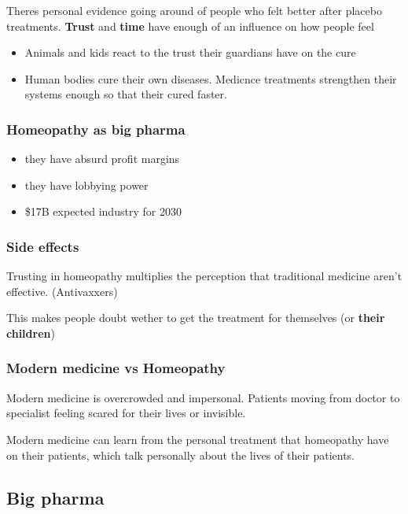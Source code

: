 		Theres personal evidence going around of people who felt better after placebo treatments. \textbf{Trust} and \textbf{time} have enough of an influence on how people feel
		\begin{itemize}
			\item Animals and kids react to the trust their guardians have on the cure
			\item Human bodies cure their own diseases. Medicnce treatments strengthen their systems enough so that their cured faster.
		\end{itemize}

	\subsubsection{Homeopathy as big pharma} 
		\begin{itemize}
			\item they have absurd profit margins
			\item they have lobbying power
			\item \$17B expected industry for 2030
		\end{itemize}


	\subsubsection{Side effects}
		Trusting in homeopathy multiplies the perception that traditional medicine aren't effective. (Antivaxxers) 

		This makes people doubt wether to get the treatment for themselves (or \textbf{their children})


	\subsubsection{Modern medicine vs Homeopathy} 

		Modern medicine is overcrowded and impersonal. Patients moving from doctor to specialist feeling scared for their lives or invisible.

		Modern medicine can learn from the personal treatment that homeopathy have on their patients, which talk personally about the lives of their patients.


\subsection{Big pharma} 

